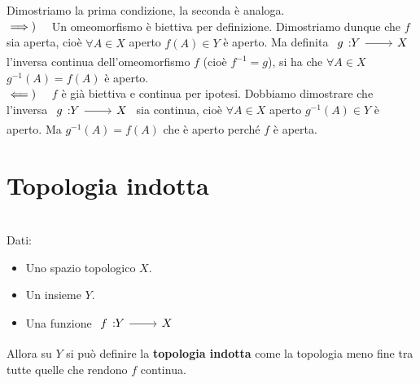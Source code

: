 \begin{demonstration}
Dimostriamo la prima condizione, la seconda è analoga.\\
$\implies)\quad$ Un omeomorfismo è biettiva per definizione. Dimostriamo dunque che $f$ sia aperta, cioè $\forall A\in X$ aperto $f\left(A\right)\in Y$ è aperto. Ma definita $\funz{g}{Y}{X}$ l'inversa continua dell'omeomorfismo $f$ (cioè $f^{-1}=g$), si ha che $\forall A\in X$ $g^{-1}\left(A\right)=f\left(A\right)$ è aperto.\\
$\impliedby)\quad$ $f$ è già biettiva e continua per ipotesi. Dobbiamo dimostrare che l'inversa $\funz{g}{Y}{X}$ sia continua, cioè $\forall A\in X$ aperto $g^{-1}\left(A\right)\in Y$ è aperto. Ma $g^{-1}\left(A\right)=f\left(A\right)$ che è aperto perché $f$ è aperta.
\end{demonstration}
\section{Topologia indotta}
\begin{define}~{}\\
Dati:
\begin{itemize}
\item Uno spazio topologico $X$.
\item Un insieme $Y$.
\item Una funzione $\funz{f}{Y}{X}$
\end{itemize}
Allora su $Y$ si può definire la \textbf{topologia indotta} come la topologia meno fine tra tutte quelle che rendono $f$ continua.
\end{define}
